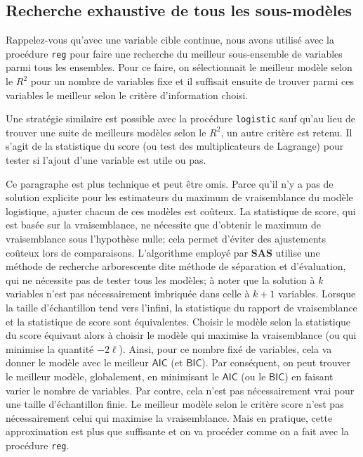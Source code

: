 \documentclass[
  11pt,
  letterpaper,
]{book}
\theoremstyle{definition}
\theoremstyle{definition}
\theoremstyle{definition}
\theoremstyle{remark}
\begin{document}
\hypertarget{recherche-exhaustive-de-tous-les-sous-moduxe8les}{%
\subsection{Recherche exhaustive de tous les sous-modèles}\label{recherche-exhaustive-de-tous-les-sous-moduxe8les}}

Rappelez-vous qu'avec une variable cible continue, nous avons utilisé avec la procédure \texttt{reg} pour faire une recherche du meilleur sous-ensemble de variables parmi tous les ensembles. Pour ce faire, on sélectionnait le meilleur modèle selon le \(R^2\) pour un nombre de variables fixe et il suffisait ensuite de trouver parmi ces variables le meilleur selon le critère d'information choisi.

Une stratégie similaire est possible avec la procédure \texttt{logistic} sauf qu'au lieu de trouver une suite de meilleurs modèles selon le \(R^2\), un autre critère est retenu. Il s'agit de la statistique du score (ou test des multiplicateurs de Lagrange) pour tester si l'ajout d'une variable est utile ou pas.

Ce paragraphe est plus technique et peut être omis. Parce qu'il n'y a pas de solution explicite pour les estimateurs du maximum de vraisemblance du modèle logistique, ajuster chacun de ces modèles est coûteux. La statistique de score, qui est basée sur la vraisemblance, ne nécessite que d'obtenir le maximum de vraisemblance sous l'hypothèse nulle; cela permet d'éviter des ajustements coûteux lors de comparaisons. L'algorithme employé par \textbf{SAS} utilise une méthode de recherche arborescente dite méthode de séparation et d'évaluation, qui ne nécessite pas de tester tous les modèles; à noter que la solution à \(k\) variables n'est pas nécessairement imbriquée dans celle à \(k+1\) variables. Lorsque la taille d'échantillon tend vers l'infini, la statistique du rapport de vraisemblance et la statistique de score sont équivalentes. Choisir le modèle selon la statistique du score équivaut alors à choisir le modèle qui maximise la vraisemblance (ou qui minimise la quantité \(-2 \ell\)). Ainsi, pour ce nombre fixé de variables, cela va donner le modèle avec le meilleur \(\mathsf{AIC}\) (et \(\mathsf{BIC}\)). Par conséquent, on peut trouver le meilleur modèle, globalement, en minimisant le \(\mathsf{AIC}\) (ou le \(\mathsf{BIC}\)) en faisant varier le nombre de variables. Par contre, cela n'est pas nécessairement vrai pour une taille d'échantillon finie. Le meilleur modèle selon le critère score n'est pas nécessairement celui qui maximise la vraisemblance. Mais en pratique, cette approximation est plus que suffisante et on va procéder comme on a fait avec la procédure \texttt{reg}.
\end{document}
